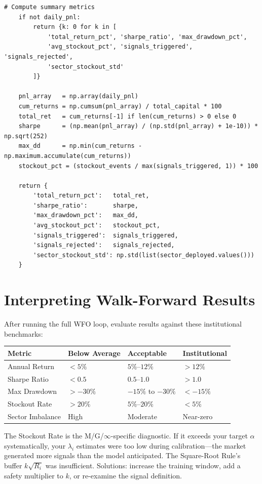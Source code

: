 \documentclass[11pt, oneside]{book}
\begin{document}
\begin{lstlisting}[style=pythonstyle, caption={Complete Walk-Forward Optimization Loop}]
    # Compute summary metrics
    if not daily_pnl:
        return {k: 0 for k in [
            'total_return_pct', 'sharpe_ratio', 'max_drawdown_pct',
            'avg_stockout_pct', 'signals_triggered', 'signals_rejected',
            'sector_stockout_std'
        ]}

    pnl_array   = np.array(daily_pnl)
    cum_returns = np.cumsum(pnl_array) / total_capital * 100
    total_ret   = cum_returns[-1] if len(cum_returns) > 0 else 0
    sharpe      = (np.mean(pnl_array) / (np.std(pnl_array) + 1e-10)) * np.sqrt(252)
    max_dd      = np.min(cum_returns - np.maximum.accumulate(cum_returns))
    stockout_pct = (stockout_events / max(signals_triggered, 1)) * 100

    return {
        'total_return_pct':   total_ret,
        'sharpe_ratio':       sharpe,
        'max_drawdown_pct':   max_dd,
        'avg_stockout_pct':   stockout_pct,
        'signals_triggered':  signals_triggered,
        'signals_rejected':   signals_rejected,
        'sector_stockout_std': np.std(list(sector_deployed.values()))
    }
\end{lstlisting}

\section{Interpreting Walk-Forward Results}

After running the full WFO loop, evaluate results against these institutional benchmarks:

\begin{center}
\begin{tabular}{llll}
\toprule
\textbf{Metric} & \textbf{Below Average} & \textbf{Acceptable} & \textbf{Institutional} \\
\midrule
Annual Return & $< 5\%$ & $5\%$--$12\%$ & $> 12\%$ \\
Sharpe Ratio & $< 0.5$ & $0.5$--$1.0$ & $> 1.0$ \\
Max Drawdown & $> -30\%$ & $-15\%$ to $-30\%$ & $< -15\%$ \\
Stockout Rate & $> 20\%$ & $5\%$--$20\%$ & $< 5\%$ \\
Sector Imbalance & High & Moderate & Near-zero \\
\bottomrule
\end{tabular}
\end{center}

The Stockout Rate is the M/G/$\infty$-specific diagnostic. If it exceeds your target $\alpha$ systematically, your $\lambda_i$ estimates were too low during calibration---the market generated more signals than the model anticipated. The Square-Root Rule's buffer $k\sqrt{R_i}$ was insufficient. Solutions: increase the training window, add a safety multiplier to $k$, or re-examine the signal definition.
\end{document}
